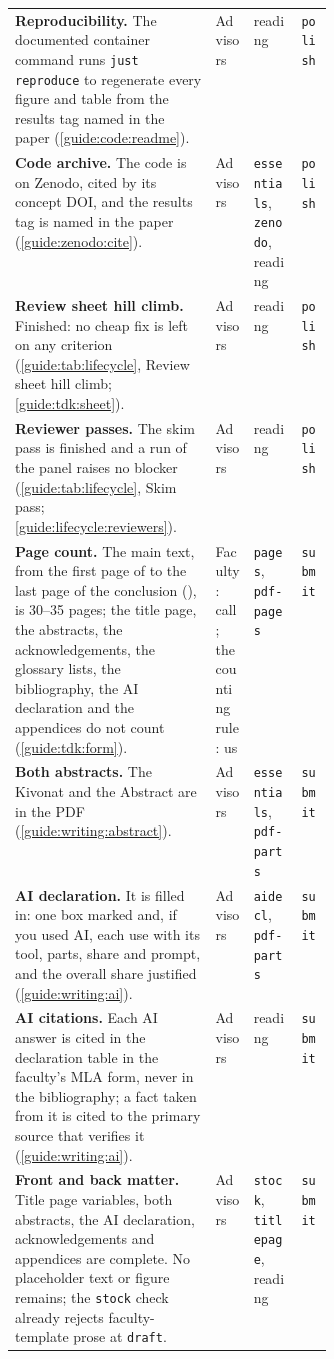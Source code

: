 {\begin{xltabular}{\linewidth}{X >{\raggedright\arraybackslash}p{0.12\linewidth} >{\raggedright\arraybackslash}p{0.15\linewidth} >{\raggedright\arraybackslash}p{0.1\linewidth}}
  \textbf{Reproducibility.} The documented container command runs \texttt{just reproduce} to regenerate every figure and table from the results tag named in the paper (\cref{guide:code:readme}). & Advisors & reading & \texttt{polish} \\
  \textbf{Code archive.} The code is on Zenodo, cited by its concept DOI, and the results tag is named in the paper (\cref{guide:zenodo:cite}). & Advisors & \texttt{essentials}, \texttt{zenodo}, reading & \texttt{polish} \\
  \textbf{Review sheet hill climb.} Finished: no cheap fix is left on any criterion (\cref{guide:tab:lifecycle}, Review sheet hill climb; \cref{guide:tdk:sheet}). & Advisors & reading & \texttt{polish} \\
  \textbf{Reviewer passes.} The skim pass is finished and a run of the panel raises no blocker (\cref{guide:tab:lifecycle}, Skim pass; \cref{guide:lifecycle:reviewers}). & Advisors & reading & \texttt{polish} \\
  \textbf{Page count.} The main text, from the first page of  to the last page of the conclusion (), is 30--35 pages; the title page, the abstracts, the acknowledgements, the glossary lists, the bibliography, the AI declaration and the appendices do not count (\cref{guide:tdk:form}). & Faculty: call; the counting rule: us & \texttt{pages}, \texttt{pdf-pages} & \texttt{submit} \\
  \textbf{Both abstracts.} The Kivonat and the Abstract are in the PDF (\cref{guide:writing:abstract}). & Advisors & \texttt{essentials}, \texttt{pdf-parts} & \texttt{submit} \\
  \textbf{AI declaration.} It is filled in: one box marked and, if you used AI, each use with its tool, parts, share and prompt, and the overall share justified (\cref{guide:writing:ai}). & Advisors & \texttt{aidecl}, \texttt{pdf-parts} & \texttt{submit} \\
  \textbf{AI citations.} Each AI answer is cited in the declaration table in the faculty's MLA form, never in the bibliography; a fact taken from it is cited to the primary source that verifies it (\cref{guide:writing:ai}). & Advisors & reading & \texttt{submit} \\
  \textbf{Front and back matter.} Title page variables, both abstracts, the AI declaration, acknowledgements and appendices are complete. No placeholder text or figure remains; the \texttt{stock} check already rejects faculty-template prose at \texttt{draft}. & Advisors & \texttt{stock}, \texttt{titlepage}, reading & \texttt{submit} \\

\end{xltabular}}
